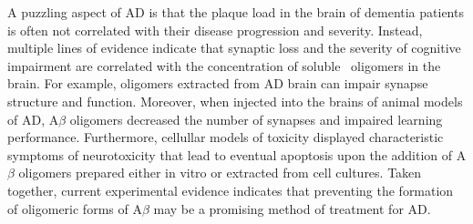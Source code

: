 A puzzling aspect of AD is that the plaque load in the brain of dementia patients is often not correlated with their disease progression and severity.\cite{Hardy:2002dh,Naslund:2000wf} Instead, multiple lines of evidence indicate that synaptic loss and the severity of cognitive impairment are correlated with the concentration of soluble \abeta\ oligomers in the brain.\cite{Wang:1999fx,McLean:1999ud,Lue:1999vx} For example, oligomers extracted from AD brain can impair synapse structure and function.\cite{Shankar:2008bg}
 Moreover, when injected into the brains of animal models of AD, A$\beta$ oligomers decreased the number of synapses and impaired learning performance.\cite{Lesne:2006gx,Cleary:2005kt,Martins:2007bz,Tam:2012vz} Furthermore, cellullar models of toxicity displayed characteristic symptoms of neurotoxicity that lead to eventual apoptosis upon the addition of A$\beta$ oligomers prepared either in vitro or extracted from cell cultures.\cite{Cappai:2007bc,Lambert:1998ve,Walsh:2002p2566,Shankar:2008bg,Walsh:2007fu} Taken together, current experimental evidence indicates that preventing the formation of oligomeric forms of A$\beta$ may be a promising method of treatment for AD.



